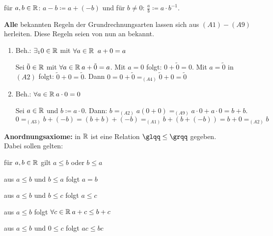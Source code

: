 \begin{schreibweisen}
	für $a, b \in \mathbb{R}$: $a - b \coloneqq a + (-b)$ und für $b \neq 0$: $ \frac{a}{b} \coloneqq a \cdot b^{-1}$.
\end{schreibweisen}


\textbf{Alle} bekannten Regeln der Grundrechnungsarten lassen sich aus \hyperref[k.axiom]{$(A1) - (A9)$} herleiten. Diese Regeln seien von nun an bekannt.


\begin{beispiele*}
	\begin{enumerate}
		\item Beh.: $\exists_{1} 0 \in  \mathbb{R}$ mit $\forall a \in \mathbb{R} \: \ a + 0 = a$
		  \begin{beweis}
			Sei $\tilde{0} \in \mathbb{R}$ mit $\forall a \in \mathbb{R} \: a + \tilde{0} = a$. Mit $a = 0$ folgt: $0 + \tilde{0} = 0$. Mit $a = \tilde{0}$ in \hyperref[k.axiom-a2]{$(A2)$} folgt: $\tilde{0} + 0 = \tilde{0}$. Dann $0 = 0 + \tilde{0} =_{\hyperref[k.axiom-a4]{(A4)}} \tilde{0} + 0 = \tilde{0}$
		  \end{beweis}
		 \item Beh.: $\forall a \in \mathbb{R} \: a \cdot 0 = 0$
		   \begin{beweis}
		     Sei $a \in \mathbb{R}$ und $b \coloneqq a \cdot 0$. Dann: $b =_{\hyperref[k.axiom-a2]{(A2)}} a (0 + 0) =_{\hyperref[k.axiom-a9]{(A9)}} a \cdot 0 + a \cdot 0 = b + b$. \\
		     $0 =_{\hyperref[k.axiom-a2]{(A3)}} b + (-b) = (b + b) + (-b) =_{\hyperref[k.axiom-a1]{(A1)}} b + (b + (-b)) = b + 0 =_{\hyperref[k.axiom-a2]{(A2)}} b$
		   \end{beweis}
	\end{enumerate}
\end{beispiele*}


\textbf{Anordnungsaxiome:}  in $\mathbb{R}$ ist eine Relation $\glqq \leq \grqq$ gegeben. \\
Dabei sollen gelten:
\begin{description}
	\label{a.axiom-a10}
	\item[\hspace{0.4cm}$(A10)$] für $a, b \in \mathbb{R}$ gilt $a \leq b$ oder $b \leq a$
	\label{a.axiom-a11}
	\item[\hspace{0.4cm}$(A11)$] aus $a \leq b$ und $b \leq a$ folgt $a = b$
	\label{a.axiom-a12}
	\item[\hspace{0.4cm}$(A12)$] aus $a \leq b$ und $b \leq c$ folgt $a \leq c$
	\label{a.axiom-a13}
	\item[\hspace{0.4cm}$(A13)$] aus $a \leq b$ folgt $\forall c \in \mathbb{R} \: a + c \leq b + c$
	\label{a.axiom-a14}
	\item[\hspace{0.4cm}$(A14)$] aus $a \leq b$ und $0 \leq c$ folgt $ac \leq b c$
\end{description}


